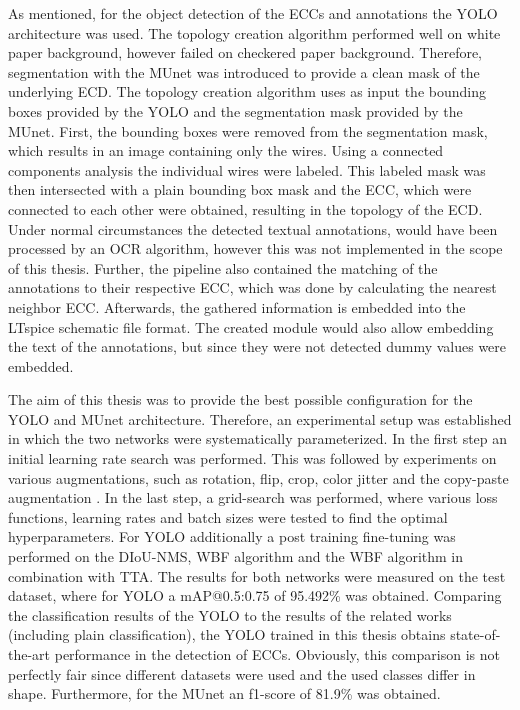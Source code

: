 As mentioned, for the object detection of the \acp{ECC} and annotations the \ac{YOLO} architecture was used.
The topology creation algorithm performed well on white paper background, however failed on checkered paper background.
Therefore, segmentation with the \ac{MUnet} was introduced to provide a clean mask of the underlying \ac{ECD}.
The topology creation algorithm uses as input the bounding boxes provided by the \ac{YOLO} and the segmentation mask provided by the \ac{MUnet}.
First, the bounding boxes were removed from the segmentation mask, which results in an image containing only the wires.
Using a connected components analysis the individual wires were labeled.
This labeled mask was then intersected with a plain bounding box mask and the \ac{ECC}, which were connected to each other were obtained, resulting in the topology of the \ac{ECD}.
Under normal circumstances the detected textual annotations, would have been processed by an \ac{OCR} algorithm, however this was not implemented in the scope of this thesis.
Further, the pipeline also contained the matching of the annotations to their respective \ac{ECC}, which was done by calculating the nearest neighbor \ac{ECC}.
Afterwards, the gathered information is embedded into the LTspice schematic file format.
The created module would also allow embedding the text of the annotations, but since they were not detected dummy values were embedded.

The aim of this thesis was to provide the best possible configuration for the \ac{YOLO} and \ac{MUnet} architecture.
Therefore, an experimental setup was established in which the two networks were systematically parameterized.
In the first step an initial learning rate search was performed.
This was followed by experiments on various augmentations, such as rotation, flip, crop, color jitter and the copy-paste augmentation \cite{copypaste_aug}.
In the last step, a grid-search was performed, where various loss functions, learning rates and batch sizes were tested to find the optimal hyperparameters.
For \ac{YOLO} additionally a post training fine-tuning was performed on the \ac{DIoU}-\ac{NMS}, \ac{WBF} algorithm and the \ac{WBF} algorithm in combination with \ac{TTA}.
The results for both networks were measured on the test dataset, where for \ac{YOLO} a \ac{mAP}@0.5:0.75 of 95.492\% was obtained.
Comparing the classification results of the \ac{YOLO} to the results of the related works (including plain classification), the \ac{YOLO} trained in this thesis obtains state-of-the-art performance in the detection of \acp{ECC}.
Obviously, this comparison is not perfectly fair since different datasets were used and the used classes differ in shape.
Furthermore, for the \ac{MUnet} an f1-score of 81.9\% was obtained.

